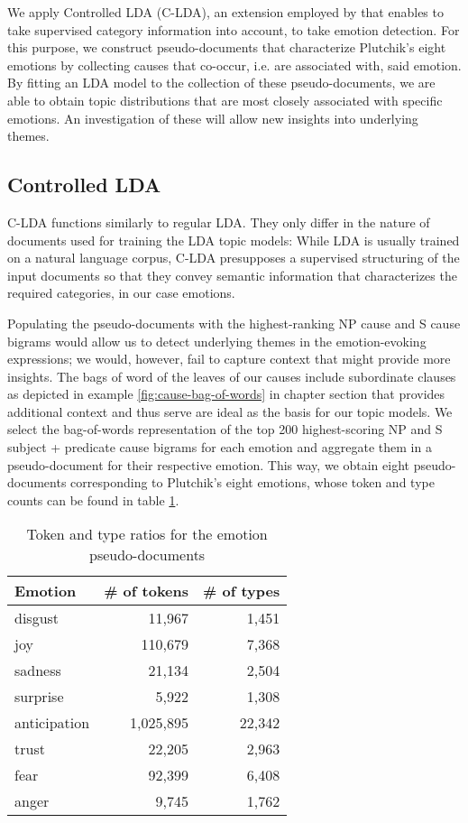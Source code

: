 We apply Controlled LDA (C-LDA), an extension employed by \citeauthor{supervised_lda} that enables to take supervised category information into account, to take emotion detection. For this purpose, we construct pseudo-documents that characterize Plutchik's eight emotions by collecting causes that co-occur, i.e. are associated with, said emotion. By fitting an LDA model to the collection of these pseudo-documents, we are able to obtain topic distributions that are most closely associated with specific emotions. An investigation of these will allow new insights into underlying themes.

\subsection{Controlled LDA}

C-LDA functions similarly to regular LDA. They only differ in the nature of documents used for training the LDA topic models: While LDA is usually trained on a natural language corpus, C-LDA presupposes a supervised structuring of the input documents so that they convey semantic information that characterizes the required categories, in our case emotions.

Populating the pseudo-documents with the highest-ranking NP cause and S cause bigrams would allow us to detect underlying themes in the emotion-evoking expressions; we would, however, fail to capture context that might provide more insights. The bags of word of the leaves of our causes include subordinate clauses as depicted in example \ref{fig:cause-bag-of-words} in chapter \label{ch:patterns} section \label{sec:extraction} that provides additional context and thus serve are ideal as the basis for our topic models. We select the bag-of-words representation of the top 200 highest-scoring NP and S subject + predicate cause bigrams for each emotion and aggregate them in a pseudo-document for their respective emotion. This way, we obtain eight pseudo-documents corresponding to Plutchik's eight emotions, whose token and type counts can be found in table \ref{tab:token-type-pseudo-doc}.

\begin{table}[]
\centering
\begin{tabular}{l|r|r}
{\bf Emotion} & {\bf \# of tokens} & {\bf \# of types} \\\hline
disgust & 11,967 & 1,451 \\
joy & 110,679 & 7,368 \\
sadness & 21,134 & 2,504 \\
surprise & 5,922 & 1,308 \\
anticipation & 1,025,895 & 22,342 \\
trust & 22,205 & 2,963 \\
fear & 92,399 & 6,408 \\
anger & 9,745 & 1,762
\end{tabular}
\caption{Token and type ratios for the emotion pseudo-documents}
\label{tab:token-type-pseudo-doc}
\end{table}

